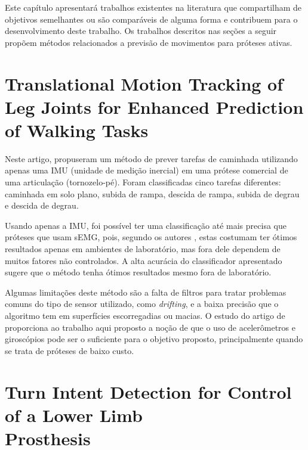 Este capítulo apresentará trabalhos existentes na literatura que compartilham de objetivos semelhantes ou são comparáveis de alguma forma e contribuem para o desenvolvimento deste trabalho. Os trabalhos descritos nas seções a seguir propõem métodos relacionados a previsão de movimentos para próteses ativas.

\section[Translational Motion Tracking of Leg Joints for Enhanced\\Prediction of Walking Tasks]{Translational Motion Tracking of Leg Joints for Enhanced Prediction of Walking Tasks}\label{sec:rel_stolyarov}

Neste artigo,  propuseram um método de prever tarefas de caminhada utilizando apenas uma IMU (unidade de medição inercial) em uma prótese comercial de uma articulação (tornozelo-pé). Foram classificadas cinco tarefas diferentes: caminhada em solo plano, subida de rampa, descida de rampa, subida de degrau e descida de degrau.

Usando apenas a IMU, foi possível ter uma classificação até mais precisa que próteses que usam sEMG, pois, segundo os autores , estas costumam ter ótimos resultados apenas em ambientes de laboratório, mas fora dele dependem de muitos fatores não controlados. A alta acurácia do classificador apresentado sugere que o método tenha ótimos resultados mesmo fora de laboratório.

Algumas limitações deste método são a falta de filtros para tratar problemas comuns do tipo de sensor utilizado, como \textit{drifting}, e a baixa precisão que o algoritmo tem em superfícies escorregadias ou macias.
% 
O estudo do artigo de  proporciona ao trabalho aqui proposto a noção de que o uso de acelerômetros e giroscópios pode ser o suficiente para o objetivo proposto, principalmente quando se trata de próteses de baixo custo.

\section[Turn Intent Detection for Control of a Lower Limb Prosthesis]{Turn Intent Detection for Control of a Lower Limb\\Prosthesis}%
\label{sec:rel_pew}

